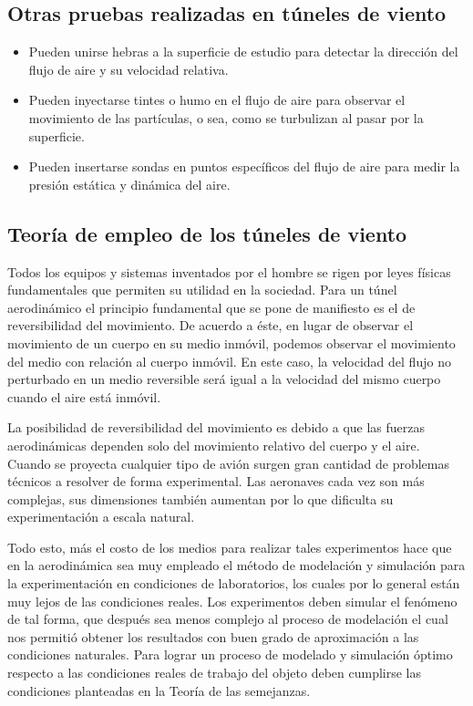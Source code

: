 \documentclass[10pt,a4paper]{article}
\begin{document}
\subsection{Otras pruebas realizadas en túneles de viento}
\begin{itemize}
\item
Pueden unirse hebras a la superficie de estudio para detectar la dirección del flujo de aire y su velocidad relativa.
\item
Pueden inyectarse tintes o humo en el flujo de aire para observar el movimiento de las partículas, o sea, como se turbulizan al pasar por la superficie.
\item
Pueden insertarse sondas en puntos específicos del flujo de aire para medir la presión estática y dinámica del aire.
\end{itemize}

\subsection{Teoría de empleo de los túneles de viento}
Todos los equipos y sistemas inventados por el hombre se rigen por leyes físicas fundamentales que permiten su utilidad en la sociedad. Para un túnel aerodinámico el principio fundamental que se pone de manifiesto es el de reversibilidad del movimiento. De acuerdo a éste, en lugar de observar el movimiento de un cuerpo en su medio inmóvil, podemos observar el movimiento del medio con relación al cuerpo inmóvil. En este caso, la velocidad del flujo no perturbado en un medio reversible será igual a la velocidad del mismo cuerpo cuando el aire está inmóvil.

La posibilidad de reversibilidad del movimiento es debido a que las fuerzas aerodinámicas dependen solo del movimiento relativo del cuerpo y el aire. Cuando se proyecta cualquier tipo de avión surgen gran cantidad de problemas técnicos a resolver de forma experimental. Las aeronaves cada vez son más complejas, sus dimensiones también aumentan por lo que dificulta su experimentación a escala natural.

Todo esto, más el costo de los medios para realizar tales experimentos hace que en la aerodinámica sea muy empleado el método de modelación y simulación para la experimentación en condiciones de laboratorios, los cuales por lo general están muy lejos de las condiciones reales. Los experimentos deben simular el fenómeno de tal forma, que después sea menos complejo al proceso de modelación el cual nos permitió obtener los resultados con buen grado de aproximación a las condiciones naturales. Para lograr un proceso de modelado y simulación óptimo respecto a las condiciones reales de trabajo del objeto deben cumplirse las condiciones planteadas en la Teoría de las semejanzas.
\end{document}
